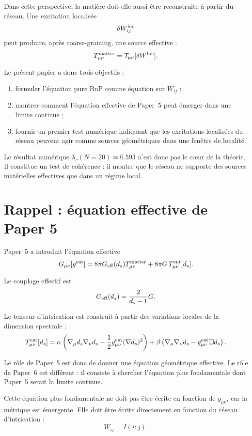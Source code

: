 \documentclass[11pt,a4paper]{article}
\begin{document}
Dans cette perspective, la matière doit elle aussi être reconstruite à partir du réseau. Une excitation localisée
\[
\delta W_{ij}^{\rm loc}
\]
peut produire, après coarse-graining, une source effective :
\[
T_{\mu\nu}^{\rm matter}
=
\mathcal{T}_{\mu\nu}[\delta W^{\rm loc}].
\]

Le présent papier a donc trois objectifs :
\begin{enumerate}
  \item formuler l'équation pure BuP comme équation sur \(W_{ij}\) ;
  \item montrer comment l'équation effective de Paper~5 peut émerger dans une limite continue ;
  \item fournir un premier test numérique indiquant que les excitations localisées du réseau peuvent agir comme sources géométriques dans une fenêtre de localité.
\end{enumerate}

Le résultat numérique \(\lambda_c(N=20)\simeq0.593\) n'est donc pas le cœur de la théorie. Il constitue un test de cohérence : il montre que le réseau ne supporte des sources matérielles effectives que dans un régime local.

\section{Rappel : équation effective de Paper 5}
\label{sec:paper5}

Paper~5 a introduit l'équation effective
\[
G_{\mu\nu}[g^{\rm ent}]
=
8\pi G_{\rm eff}(d_s)T_{\mu\nu}^{\rm matter}
+
8\pi G\,T_{\mu\nu}^{\rm ent}[d_s].
\]

Le couplage effectif est
\[
G_{\rm eff}(d_s)
=
\frac{2}{d_s-1}G.
\]

Le tenseur d'intrication est construit à partir des variations locales de la dimension spectrale :
\[
T_{\mu\nu}^{\rm ent}[d_s]
=
\alpha
\left(
\nabla_\mu d_s\nabla_\nu d_s
-
\frac12 g_{\mu\nu}^{\rm ent}(\nabla d_s)^2
\right)
+
\beta
\left(
\nabla_\mu\nabla_\nu d_s
-
g_{\mu\nu}^{\rm ent}\Box d_s
\right).
\]

Le rôle de Paper~5 est donc de donner une équation géométrique effective. Le rôle de Paper~6 est différent : il consiste à chercher l'équation plus fondamentale dont Paper~5 serait la limite continue.

Cette équation plus fondamentale ne doit pas être écrite en fonction de \(g_{\mu\nu}\), car la métrique est émergente. Elle doit être écrite directement en fonction du réseau d'intrication :
\[
W_{ij}=I(i:j).
\]
\end{document}
